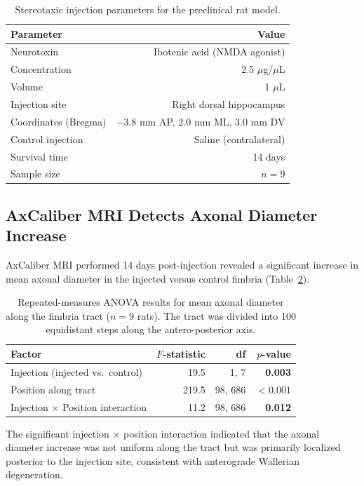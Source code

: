 \documentclass[11pt]{article}
\begin{document}
\begin{table}[H]
\centering
\caption{Stereotaxic injection parameters for the preclinical rat model.}
\label{tab:injection}
\begin{tabular}{lr}
\toprule
\textbf{Parameter} & \textbf{Value} \\
\midrule
Neurotoxin & Ibotenic acid (NMDA agonist) \\
Concentration & 2.5 $\mu$g/$\mu$L \\
Volume & 1 $\mu$L \\
Injection site & Right dorsal hippocampus \\
Coordinates (Bregma) & $-3.8$ mm AP, 2.0 mm ML, 3.0 mm DV \\
Control injection & Saline (contralateral) \\
Survival time & 14 days \\
Sample size & $n = 9$ \\
\bottomrule
\end{tabular}
\end{table}

\subsection{AxCaliber MRI Detects Axonal Diameter Increase}

AxCaliber MRI performed 14 days post-injection revealed a significant increase in mean axonal diameter in the injected versus control fimbria (Table~\ref{tab:mri_results}).

\begin{table}[H]
\centering
\caption{Repeated-measures ANOVA results for mean axonal diameter along the fimbria tract ($n = 9$ rats). The tract was divided into 100 equidistant steps along the antero-posterior axis.}
\label{tab:mri_results}
\begin{tabular}{lrrr}
\toprule
\textbf{Factor} & \textbf{$F$-statistic} & \textbf{df} & \textbf{$p$-value} \\
\midrule
Injection (injected vs.\ control) & 19.5 & 1, 7 & \textbf{0.003} \\
Position along tract & 219.5 & 98, 686 & $<0.001$ \\
Injection $\times$ Position interaction & 11.2 & 98, 686 & \textbf{0.012} \\
\bottomrule
\end{tabular}
\end{table}

The significant injection $\times$ position interaction indicated that the axonal diameter increase was not uniform along the tract but was primarily localized posterior to the injection site, consistent with anterograde Wallerian degeneration.
\end{document}
